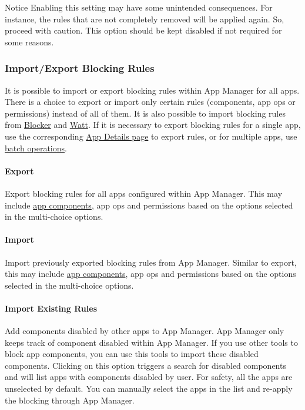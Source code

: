 \begin{warning}{Notice}
    Enabling this setting may have some unintended consequences.
    For instance, the rules that are not completely removed will be applied again.
    So, proceed with caution.
    This option should be kept disabled if not required for some reasons.
\end{warning}


\subsubsection{Import/Export Blocking Rules}
It is possible to import or export blocking rules within App Manager for all apps.
There is a choice to export or import only certain rules (components, app ops or permissions) instead of all of them.
It is also possible to import blocking rules from \href{https://github.com/lihenggui/blocker}{Blocker} and
\href{https://github.com/tuyafeng/Watt}{Watt}.
If it is necessary to export blocking rules for a single app, use the corresponding \hyperref[sec:app-details-page]{App
Details page} to export rules, or for multiple apps, use \hyperref[subsec:batch-operations]{batch operations}.


\paragraph{Export} Export blocking rules for all apps configured within App Manager.
This may include \hyperref[subsec:faq:what-are-app-components]{app components}, app ops and permissions based on the
options selected in the multi-choice options.

\paragraph{Import} Import previously exported blocking rules from App Manager.
Similar to export, this may include \hyperref[subsec:faq:what-are-app-components]{app components}, app ops and
permissions based on the options selected in the multi-choice options.

\paragraph{Import Existing Rules}
\label{par:import-existing-rules}
Add components disabled by other apps to App Manager.
App Manager only keeps track of component disabled within App Manager.
If you use other tools to block app components, you can use this tools to import these disabled components.
Clicking on this option triggers a search for disabled components and will list apps with components disabled by user.
For safety, all the apps are unselected by default.
You can manually select the apps in the list and re-apply the blocking through App Manager.

